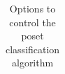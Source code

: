 \begin{table}
\begin{center}
\begin{tabular}{|p{4cm}|p{3cm}|p{8cm}|}
\end{tabular}
\end{center}
\caption{\label{tab:pc:options}Options to control the poset classification algorithm}
\end{table}
